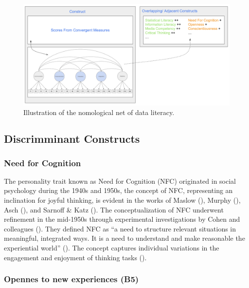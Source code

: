 \documentclass[
  12pt,
  a4paper,
  twoside]{article}
\begin{document}
\begin{figure}

{\centering \includegraphics[width=1\linewidth]{images/DL_Nomological_Net} 

}

\caption{Illustration of the nomological net of data literacy.  }\label{fig:workflow}
\end{figure}

\subsection{Discrimminant Constructs}\label{discrimminant-constructs}

\subsubsection{Need for Cognition}\label{need-for-cognition}

The personality trait known as Need for Cognition (NFC) originated in social psychology during the 1940s and 1950s, the concept of NFC, representing an inclination for joyful thinking, is evident in the works of Maslow (), Murphy (), Asch (), and Sarnoff \& Katz (). The conceptualization of NFC underwent refinement in the mid-1950s through experimental investigations by Cohen and colleagues (). They defined NFC as ``a need to structure relevant situations in meaningful, integrated ways. It is a need to understand and make reasonable the experiential world'' (). The concept captures individual variations in the engagement and enjoyment of thinking tasks ().

\subsubsection{Opennes to new experiences (B5)}\label{opennes-to-new-experiences-b5}
\end{document}
